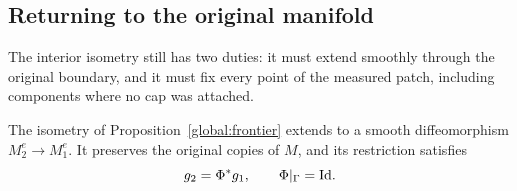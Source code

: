 \subsection{Returning to the original manifold}

The interior isometry still has two duties: it must extend smoothly
through the original boundary, and it must fix every point of the
measured patch, including components where no cap was attached.

\begin{proposition}
\label{global:completion}
The isometry of Proposition~\ref{global:frontier} extends to a smooth
diffeomorphism $M_2^e\to M_1^e$. It preserves the original copies
of $M$, and its restriction satisfies
\[
 g_2=\Phi^*g_1,\qquad \Phi|_\Gamma=\mathrm{Id}.
\]
\end{proposition}

